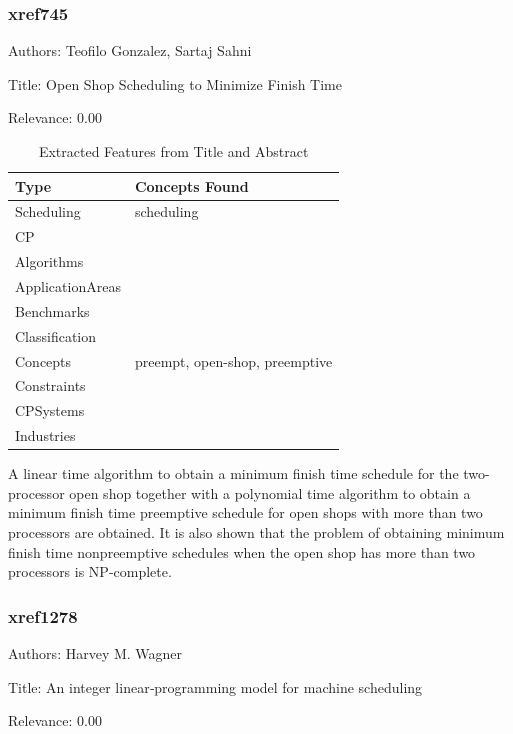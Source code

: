 \subsubsection{xref745}
\label{mw:xref745}

Authors: Teofilo Gonzalez, Sartaj Sahni

Title: Open Shop Scheduling to Minimize Finish Time

Relevance:  0.00

{\scriptsize
\begin{longtable}{p{2cm}p{20cm}}
\caption{Extracted Features from Title and Abstract}\\ \toprule
Type & Concepts Found\\ \midrule
\endhead
\bottomrule
\endfoot
Scheduling & scheduling\\ 
CP & \\ 
Algorithms & \\ 
ApplicationAreas & \\ 
Benchmarks & \\ 
Classification & \\ 
Concepts & preempt, open-shop, preemptive\\ 
Constraints & \\ 
CPSystems & \\ 
Industries & \\ 
\end{longtable}
}

 A linear time algorithm to obtain a minimum finish time schedule for the two-processor open shop together with a polynomial time algorithm to obtain a minimum finish time preemptive schedule for open shops with more than two processors are obtained. It is also shown that the problem of obtaining minimum finish time nonpreemptive schedules when the open shop has more than two processors is NP-complete. 

\subsubsection{xref1278}
\label{mw:xref1278}

Authors: Harvey M. Wagner

Title: An integer linear‐programming model for machine scheduling

Relevance:  0.00

